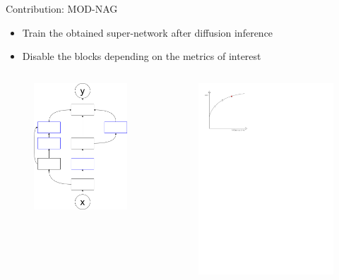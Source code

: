\documentclass[aspectratio=169,xcolor=dvipsnames]{beamer}
\begin{document}
\begin{frame}{Contribution: MOD-NAG}
    \begin{itemize}
        \item Train the obtained super-network after diffusion inference
        \item Disable the blocks depending on the metrics of interest
    \end{itemize}
    \begin{columns}[c]
        \begin{figure}[htbp]
            \centering
            \includegraphics[width=.6\textwidth]{diagram.drawio.png}
        \end{figure}
        \begin{figure}[htbp]
            \centering
            \includegraphics[width=.6\textwidth]{pareto_front.pdf}
        \end{figure}
    \end{columns}
\end{frame}
\end{document}
